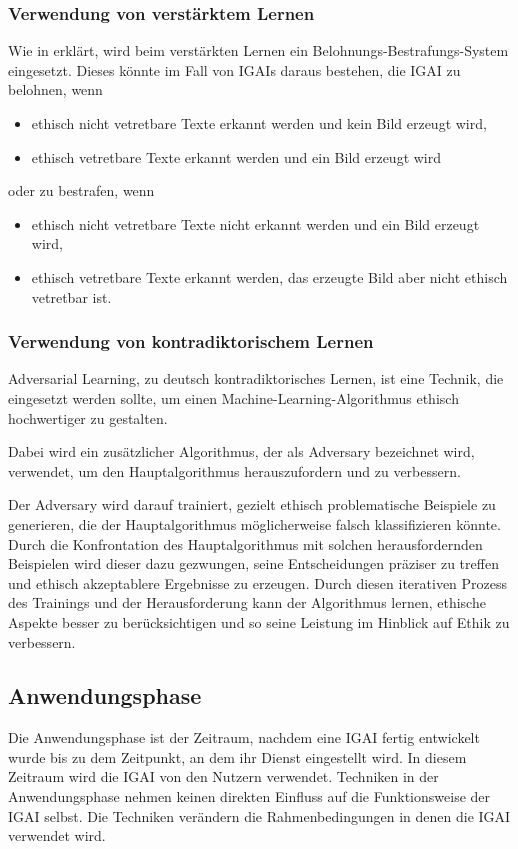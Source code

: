 \documentclass[12pt]{report}
\begin{document}
\subsubsection{Verwendung von verstärktem Lernen}
Wie in  erklärt, wird beim verstärkten Lernen ein Belohnungs-Bestrafungs-System eingesetzt. Dieses könnte im Fall von IGAIs daraus bestehen, die IGAI zu belohnen, wenn 
\begin{itemize}
    \item ethisch nicht vetretbare Texte erkannt werden und kein Bild erzeugt wird,
    \item ethisch vetretbare Texte erkannt werden und ein Bild erzeugt wird
\end{itemize}
oder zu bestrafen, wenn
\begin{itemize}
    \item ethisch nicht vetretbare Texte nicht erkannt werden und ein Bild erzeugt wird,
    \item ethisch vetretbare Texte erkannt werden, das erzeugte Bild aber nicht ethisch vetretbar ist.
\end{itemize}  

\subsubsection{Verwendung von kontradiktorischem Lernen}
Adversarial Learning, zu deutsch kontradiktorisches Lernen, ist eine Technik, die eingesetzt werden sollte, um einen Machine-Learning-Algorithmus ethisch hochwertiger zu gestalten. 

Dabei wird ein zusätzlicher Algorithmus, der als Adversary bezeichnet wird, verwendet, um den Hauptalgorithmus herauszufordern und zu verbessern. \cite[S. 3]{Kurakin}

Der Adversary wird darauf trainiert, gezielt ethisch problematische Beispiele zu generieren, die der Hauptalgorithmus möglicherweise falsch klassifizieren könnte.
Durch die Konfrontation des Hauptalgorithmus mit solchen herausfordernden Beispielen wird dieser dazu gezwungen, seine Entscheidungen präziser zu treffen und ethisch akzeptablere Ergebnisse zu erzeugen. Durch diesen iterativen Prozess des Trainings und der Herausforderung kann der Algorithmus lernen, ethische Aspekte besser zu berücksichtigen und so seine Leistung im Hinblick auf Ethik zu verbessern. 

\subsection{Anwendungsphase}
Die Anwendungsphase ist der Zeitraum, nachdem eine IGAI fertig entwickelt wurde bis zu dem Zeitpunkt, an dem ihr Dienst eingestellt wird. In diesem Zeitraum wird die IGAI von den Nutzern verwendet. Techniken in der Anwendungsphase nehmen keinen direkten Einfluss auf die Funktionsweise der IGAI selbst. Die Techniken verändern die Rahmenbedingungen in denen die IGAI verwendet wird.
\end{document}
